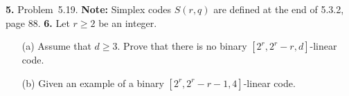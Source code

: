 \documentclass[12pt]{amsart}
\begin{document}
{\bf 5.} Problem~5.19. {\bf Note:} Simplex codes $S(r,q)$ are defined at the end of 5.3.2, page 88.
\skv
{\bf 6.} Let $r\geq 2$ be an integer.
\begin{itemize}
\item[(a)] Assume that $d\geq 3$. Prove that there is no binary $[2^r,2^r-r,d]$-linear code.
\item[(b)] Given an example of a  binary $[2^r,2^r-r-1,4]$-linear code.
\end{itemize}
 
\end{document}
